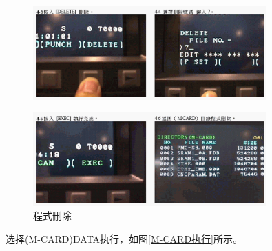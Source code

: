 \begin{figure}[!hbtp]
	\centering	\includegraphics[width=0.8\textwidth]{images/14-23}
\end{figure}

\begin{figure}[!hbtp]
	\centering	\includegraphics[width=0.8\textwidth]{images/14-24}
	\caption{程式刪除} \label{程式刪除}
\end{figure}
选择(M-CARD)DATA执行，如图\ref{M-CARD执行}所示。

